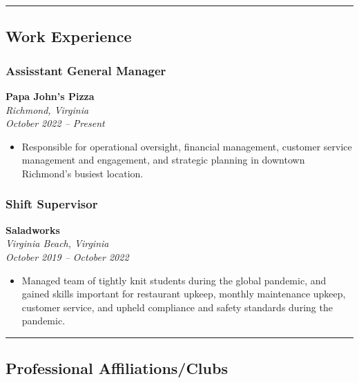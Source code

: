 \documentclass[
  letterpaper,
  DIV=11,
  numbers=noendperiod]{scrartcl}
\providecommand{\tightlist}{%
  \setlength{\itemsep}{0pt}\setlength{\parskip}{0pt}}\usepackage{longtable,booktabs,array}
\begin{document}
\begin{center}\rule{0.5\linewidth}{0.5pt}\end{center}

\subsection{Work Experience}\label{work-experience}

\subsubsection{Assisstant General
Manager}\label{assisstant-general-manager}

\textbf{Papa John's Pizza}\\
\emph{Richmond, Virginia}\\
\emph{October 2022 -- Present}

\begin{itemize}
\tightlist
\item
  Responsible for operational oversight, financial management, customer
  service management and engagement, and strategic planning in downtown
  Richmond's busiest location.
\end{itemize}

\subsubsection{Shift Supervisor}\label{shift-supervisor}

\textbf{Saladworks}\\
\emph{Virginia Beach, Virginia}\\
\emph{October 2019 -- October 2022}

\begin{itemize}
\tightlist
\item
  Managed team of tightly knit students during the global pandemic, and
  gained skills important for restaurant upkeep, monthly maintenance
  upkeep, customer service, and upheld compliance and safety standards
  during the pandemic.
\end{itemize}

\begin{center}\rule{0.5\linewidth}{0.5pt}\end{center}

\subsection{Professional
Affiliations/Clubs}\label{professional-affiliationsclubs}
\end{document}
